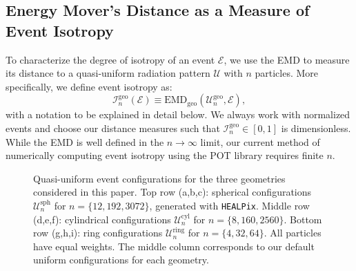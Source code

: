 \documentclass[letterpaper,11pt]{article}
\newcommand{\iso}[2]{\mathcal{I}^\text{#1}_{#2}}
\begin{document}
\subsection{Energy Mover's Distance as a Measure of Event Isotropy}



To characterize the degree of isotropy of an event $\mathcal{E}$, we use the EMD to measure its distance to a quasi-uniform radiation pattern $\mathcal{U}$ with $n$ particles.
%
More specifically, we define event isotropy as:
%
\begin{equation}
\iso{geo}{n}( \mathcal{E}) \equiv \text{EMD}_\text{geo}( \mathcal{U}^\text{geo}_n,\mathcal{E}),
\label{eq:eventIsoDef}
\end{equation}
%
with a notation to be explained in detail below.
%
We always work with normalized events and choose our distance measures such that $\iso{geo}{n} \in [0,1]$ is dimensionless.
%
While the EMD is well defined in the $n\rightarrow\infty$ limit, our current method of numerically computing event isotropy using the POT library requires finite $n$. 


\begin{figure}[p]
\begin{centering}
%
     \hfill
    \hfill
\hfill
%
     \hfill
    \hfill
\hfill     
%
     \hfill
    \hfill
     \end{centering}
\caption{
Quasi-uniform event configurations for the three geometries considered in this paper.
%
{Top row} (a,b,c):  spherical configurations $\mathcal{U}^\text{sph}_n$ for $n=\{12,192,3072\}$, generated with \texttt{HEALPix}.
%
{Middle row} (d,e,f): cylindrical configurations $\mathcal{U}^\text{cyl}_n$ for $n=\{8,160,2560\}$.
% 
{Bottom row} (g,h,i): ring configurations $\mathcal{U}^\text{ring}_n$ for $n=\{4,32,64\}$.
%
All particles have equal weights.
%
The middle column corresponds to our default uniform configurations for each geometry.
}
\label{fig:geoVis}
%
\end{figure}
\end{document}
